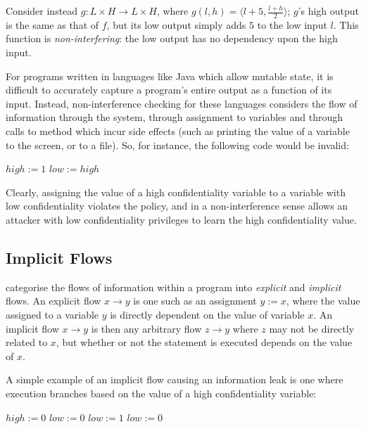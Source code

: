 Consider instead $ g: L \times H \rightarrow L \times H $, where $ g(l, h) = \langle l + 5, \frac{l + h}{2} \rangle $; $ g $'s high output is the same as that of $ f $, but its low output simply adds $ 5 $ to the low input $ l $. This function is \textit{non-interfering}: the low output has no dependency upon the high input.

For programs written in languages like Java which allow mutable state, it is difficult to accurately capture a program's entire output as a function of its input. Instead, non-interference checking for these languages considers the flow of information through the system, through assignment to variables and through calls to method which incur side effects (such as printing the value of a variable to the screen, or to a file). So, for instance, the following code would be invalid:

\begin{algorithmic}
\State $ high := 1 $
\State $ low := high $
\end{algorithmic}

Clearly, assigning the value of a high confidentiality variable to a variable with low confidentiality violates the policy, and in a non-interference sense allows an attacker with low confidentiality privileges to learn the high confidentiality value.

\subsection{Implicit Flows}

\citeauthor{denning1977certification} \cite{denning1977certification} categorise the flows of information within a program into \textit{explicit} and \textit{implicit} flows. An explicit flow $ x \rightarrow y $ is one such as an assignment $ y := x $, where the value assigned to a variable $ y $ is directly dependent on the value of variable $ x $. An implicit flow $ x \rightarrow y $ is then any arbitrary flow $ z \rightarrow y $ where $ z $ may not be directly related to $ x $, but whether or not the statement is executed depends on the value of $ x $.

A simple example of an implicit flow causing an information leak is one where execution branches based on the value of a high confidentiality variable:

\begin{algorithmic}
	\State $ high := 0 $
	\State $ low := 0 $
		\State $ low := 1 $
	\Else
		\State $ low := 0 $
	\EndIf
\end{algorithmic}

